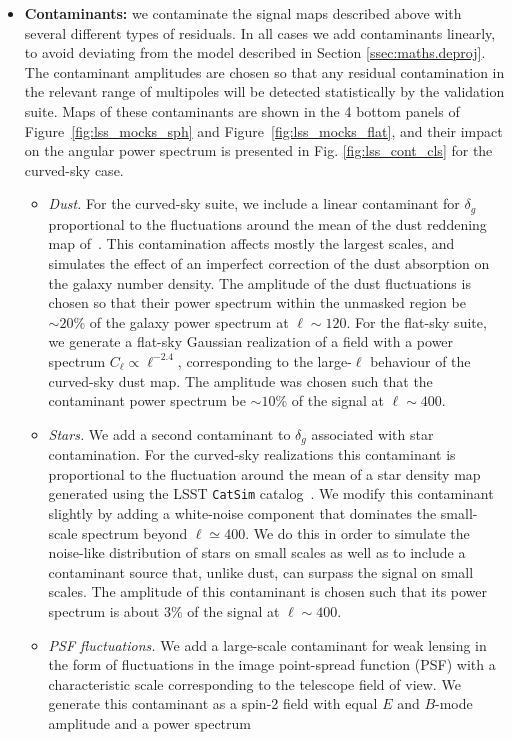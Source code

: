 \documentclass[usenatbib]{mnrasb}
\begin{document}
\begin{itemize}
          \item {\bf Contaminants:} we contaminate the signal maps described above with several different types of residuals. In all cases we add contaminants linearly, to avoid deviating from the model described in Section \ref{ssec:maths.deproj}. The contaminant amplitudes are chosen so that any residual contamination in the relevant range of multipoles will be detected statistically by the validation suite. Maps of these contaminants are shown in the 4 bottom panels of Figure~\ref{fig:lss_mocks_sph} and Figure~\ref{fig:lss_mocks_flat}, and their impact on the angular power spectrum is presented in Fig. \ref{fig:lss_cont_cls} for the curved-sky case.
          \begin{itemize}
            \item {\sl Dust.} For the curved-sky suite, we include a linear contaminant for $\delta_g$ proportional to the fluctuations around the mean of the dust reddening map of~\citet{1998wfsc.conf..297S}. This contamination affects mostly the largest scales, and simulates the effect of an imperfect correction of the dust absorption on the galaxy number density. The amplitude of the dust fluctuations is chosen so that their power spectrum within the unmasked region be $\sim20\%$ of the galaxy power spectrum at $\ell\sim120$. For the flat-sky suite, we generate a flat-sky Gaussian realization of a field with a power spectrum $C_\ell\propto\ell^{-2.4}$, corresponding to the large-$\ell$ behaviour of the curved-sky dust map. The amplitude was chosen such that the contaminant power spectrum be $\sim10\%$ of the signal at $\ell\sim400$.
            \item {\sl Stars.} We add a second contaminant to $\delta_g$ associated with star contamination. For the curved-sky realizations this contaminant is proportional to the fluctuation around the mean of a star density map generated using the LSST {\tt CatSim} catalog~\citep{2014SPIE.9150E..14C}. We modify this contaminant slightly by adding a white-noise component that dominates the small-scale spectrum beyond $\ell\simeq400$. We do this in order to simulate the noise-like distribution of stars on small scales as well as to include a contaminant source that, unlike dust, can surpass the signal on small scales. The amplitude of this contaminant is chosen such that its power spectrum is about 3\% of the signal at $\ell\sim400$.
            \item {\sl PSF fluctuations.} We add a large-scale contaminant for weak lensing in the form of fluctuations in the image point-spread function (PSF) with a characteristic scale corresponding to the telescope field of view. We generate this contaminant as a spin-2 field with equal $E$ and $B$-mode amplitude and a power spectrum

\end{itemize}
\end{itemize}
\end{document}
